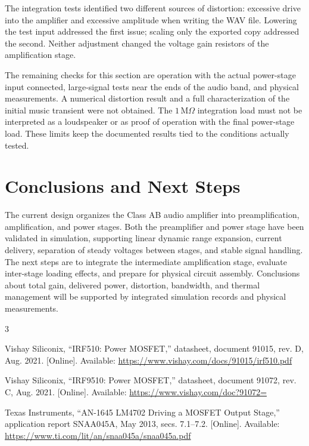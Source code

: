 \documentclass[conference]{IEEEtran}
\begin{document}
The integration tests identified two different sources of distortion: excessive drive into the amplifier and excessive amplitude when writing the WAV file. Lowering the test input addressed the first issue; scaling only the exported copy addressed the second. Neither adjustment changed the voltage gain resistors of the amplification stage.

The remaining checks for this section are operation with the actual power-stage input connected, large-signal tests near the ends of the audio band, and physical measurements. A numerical distortion result and a full characterization of the initial music transient were not obtained. The $1\,\mathrm{M}\Omega$ integration load must not be interpreted as a loudspeaker or as proof of operation with the final power-stage load. These limits keep the documented results tied to the conditions actually tested.

\balance

\section{Conclusions and Next Steps}
The current design organizes the Class AB audio amplifier into preamplification, amplification, and power stages. Both the preamplifier and power stage have been validated in simulation, supporting linear dynamic range expansion, current delivery, separation of steady voltages between stages, and stable signal handling. The next steps are to integrate the intermediate amplification stage, evaluate inter-stage loading effects, and prepare for physical circuit assembly. Conclusions about total gain, delivered power, distortion, bandwidth, and thermal management will be supported by integrated simulation records and physical measurements.

\begin{thebibliography}{3}

Vishay Siliconix, ``IRF510: Power MOSFET,'' datasheet, document 91015, rev. D, Aug. 2021. [Online]. Available: \url{https://www.vishay.com/docs/91015/irf510.pdf}

Vishay Siliconix, ``IRF9510: Power MOSFET,'' datasheet, document 91072, rev. C, Aug. 2021. [Online]. Available: \url{https://www.vishay.com/doc?91072=}

Texas Instruments, ``AN-1645 LM4702 Driving a MOSFET Output Stage,'' application report SNAA045A, May 2013, secs. 7.1--7.2. [Online]. Available: \url{https://www.ti.com/lit/an/snaa045a/snaa045a.pdf}

\end{thebibliography}
\end{document}
